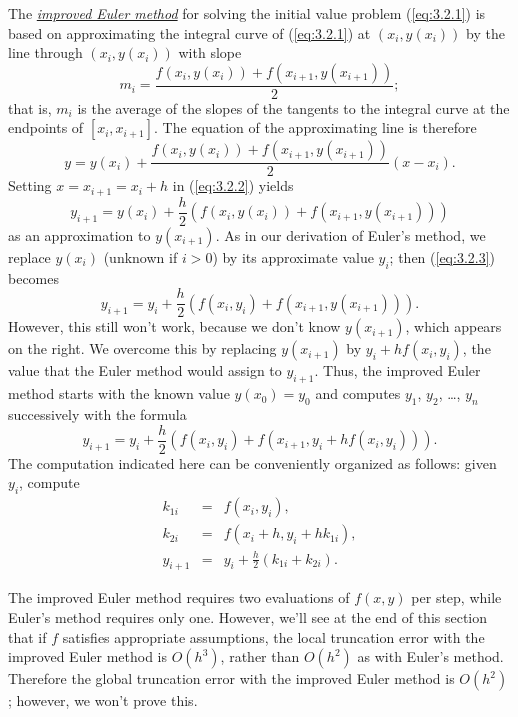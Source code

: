 \noindent
The \href{https://mathshistory.st-andrews.ac.uk/Biographies/Euler/}{\color{blue}
\it improved Euler method\/} for solving the initial value problem (\ref{eq:3.2.1}) is based on
approximating the integral curve of (\ref{eq:3.2.1}) at $(x_{i},y(x_{i}))$ by the line through
$(x_{i},y(x_{i}))$ with slope
\[
  m_{i}=\frac{f(x_{i},y(x_{i}))+f(x_{i+1},y(x_{i+1}))}{2};
\]
that is, $m_{i}$ is the average of the slopes of the tangents to the integral curve at the endpoints
of $[x_{i},x_{i+1}]$. The equation of the approximating line is therefore
\begin{equation}
  \label{eq:3.2.2}y=y(x_{i})+\frac{f(x_{i},y(x_{i}))+f(x_{i+1},y(x_{i+1}))}{2}(x-x_{i}).
\end{equation}
Setting $x=x_{i+1}=x_{i}+h$ in (\ref{eq:3.2.2}) yields
\begin{equation}
  \label{eq:3.2.3}y_{i+1}=y(x_{i})+\frac{h}{2}\left(f(x_{i},y(x_{i}))+f(x_{i+1},y(x_{i+1}))\right)
\end{equation}
as an approximation to $y(x_{i+1})$. As in our derivation of Euler's method, we replace $y(x_{i})$
(unknown if $i>0$) by its approximate value $y_{i}$; then (\ref{eq:3.2.3}) becomes
\[
  y_{i+1}=y_{i}+\frac{h}{2}\left(f(x_{i},y_{i})+f(x_{i+1},y(x_{i+1}))\right).
\]
However, this still won't work, because we don't know $y(x_{i+1})$, which appears on the right. We
overcome this by replacing $y(x_{i+1})$ by $y_{i}+hf(x_{i},y_{i})$, the value that the Euler method
would assign to $y_{i+1}$. Thus, the improved Euler method starts with the known value
$y(x_{0})=y_{0}$ and computes $y_{1}$, $y_{2}$, \dots, $y_{n}$ successively with the formula
\begin{equation}
  \label{eq:3.2.4}y_{i+1}=y_{i}+\frac{h}{2}\left(f(x_{i},y_{i})+f(x_{i+1},y_{i}+hf(x_{i},y_{i}))\right).
\end{equation}
The computation indicated here can be conveniently organized as follows: given $y_{i}$, compute
\begin{eqnarray*}
  k_{1i}  & = & f(x_{i},y_{i}),                      \\
  k_{2i}  & = & f\left(x_{i}+h,y_{i}+hk_{1i}\right), \\
  y_{i+1} & = & y_{i}+\frac{h}{2}(k_{1i}+k_{2i}).
\end{eqnarray*}

The improved Euler method requires two evaluations of $f(x,y)$ per step, while Euler's method
requires only one. However, we'll see at the end of this section that if $f$ satisfies appropriate
assumptions, the local truncation error with the improved Euler method is $O(h^{3})$, rather than
$O(h^{2})$ as with Euler's method. Therefore the global truncation error with the improved Euler
method is $O(h^{2})$; however, we won't prove this.

